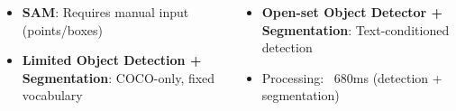 \documentclass[serif, aspectratio=169, 9pt]{beamer}
\begin{document}
\begin{frame}
    \vspace{0.4em}
    \begin{columns}[T]
        \centering
        \begin{itemize}
            \item \textbf{SAM}: Requires manual input (points/boxes)
            \item \textbf{Limited Object Detection + Segmentation}: COCO-only, fixed vocabulary
        \end{itemize}
        \centering
        \begin{itemize}
            \item \textbf{Open-set Object Detector + Segmentation}: Text-conditioned detection
            \item Processing: ~680ms (detection + segmentation)
        \end{itemize}
    \end{columns}
\end{frame}
\end{document}
